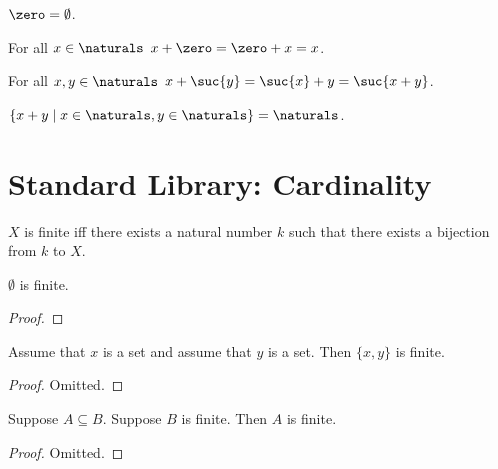 \begin{abbreviation}\label{num_zero_is_emptyset}
    $\zero = \emptyset$.
\end{abbreviation}

\begin{axiom}\label{num_addition_axiom_1}
    For all $x \in \naturals$ $x + \zero = \zero + x = x$.
\end{axiom}

\begin{axiom}\label{num_addition_axiom_2}
    For all $x, y \in \naturals$ $x + \suc{y} = \suc{x} + y = \suc{x+y}$.
\end{axiom}

\begin{lemma}\label{num_naturals_is_equal_to_two_times_naturals}
    $\{x+y \mid x \in \naturals, y \in \naturals \} = \naturals$.
\end{lemma}



\section{Standard Library: Cardinality}\label{form_sec_cardinality}

\begin{definition}\label{finite}
    $X$ is finite iff there exists a natural number $k$ such that
        there exists a bijection from $k$ to $X$.
\end{definition}


\begin{lemma} \label{emptyset_is_finite}
    $\emptyset$ is finite.
\end{lemma}
\begin{proof}
\end{proof}

\begin{lemma} \label{pair_is_finite}
    Assume that $x$ is a set and assume that $y$ is a set.
    Then $\{x,y\}$ is finite.
\end{lemma}
\begin{proof}
 Omitted.
\end{proof}

\begin{lemma} \label{subseteq_finite_is_finite}
    Suppose $A\subseteq B$.
    Suppose $B$ is finite.
    Then $A$ is finite.
\end{lemma}
\begin{proof}
    Omitted.
\end{proof}

